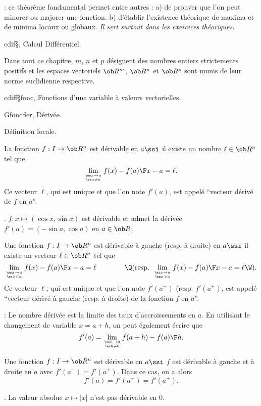 \Remarque : ce théorème fondamental permet entre autres : \pn
a) de prouver que l'on peut minorer ou majorer une fonction. \pn
b) d'établir l'existence théorique de maxima et de minima locaux ou globaux. \pn
{\it Il sert surtout dans les exercices théoriques. }

%

\Chapter cdif§, Calcul Différentiel. 

\bigskip
Dans tout ce chapitre, $m$, $n$ et $p$ désignent des nombres entiers strictements positifs et les espaces vectoriels $\ob R^m$, $\ob R^n$ et $\ob R^p$ sont munis de leur norme euclidienne respective. 
\bigskip

\Section cdiff§fonc, Fonctions d'une variable à valeurs vectorielles. 

\Subsection Gfoncder, Dérivée. 

\Concept Définition locale. 

\Definition [$a\in I$ intervalle]
La fonction $f:I\to\ob R^n$ est dérivable en $a\ssi$ il existe un nombre $\ell\in\ob R^n$ tel que 
$$
\lim_{\ss x\to a\atop\ss x\neq a}{f(x)-f(a)\F x-a}=\ell. 
$$
Ce vecteur $\ell$, qui est unique et que l'on note $f'(a)$, est appelé ``vecteur dérivé de $f$ en $a$''. 

\Exemple. $f:x\mapsto(\cos x,\sin x)$ est dérivable et admet la dérivée $f'(a)=(-\sin a, \cos a)$ en $a\in\ob R$. 

\Definition [$a\in I$ intervalle] 
Une fonction $f:I\to\ob R^n$ est dérivable à gauche (resp. à droite) en $a\ssi$ il existe un vecteur $\ell\in\ob R^n$ tel que 
$$
\lim_{\ss x\to a\atop\ss x<a}{f(x)-f(a)\F x-a}=\ell\qquad\qquad\Q(\mbox{resp. }\lim_{\ss x\to a\atop\ss x>a}{f(x)-f(a)\F x-a}=\ell\W). 
$$
Ce vecteur $\ell$, qui est unique et que l'on note $f'(a^-)$ (resp. $f'(a^+)$, est appelé ``vecteur dérivé à gauche (resp. à droite) 
de la fonction $f$ en $a$''. 

\Remarque : Le nombre dérivée est la limite des taux d'accroissements en $a$. En utilisant le changement de variable $x=a+h$, on peut également écrire que 
$$
f'(a)=\lim_{\ss h\to 0\atop\ss h\neq 0}{f(a+h)-f(a)\F h}. 
$$

Une fonction $f:I\to\ob R^n$ est dérivable en $a\ssi$ $f$ est dérivable à gauche et à droite en $a$ avec $f'(a^-)=f'(a^+)$. 
Dans ce cas, on a alors
$$
f'(a)=f'(a^-)=f'(a^+).
$$

\Exemple. La valeur absolue $x\mapsto|x|$ n'est pas dérivable en $0$. 
\bigskip

